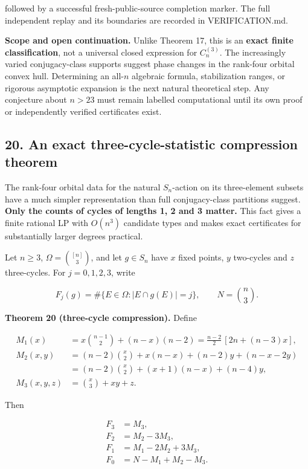 \documentclass[
  11pt,
]{article}
\begin{document}
followed by a successful fresh-public-source completion marker. The full
independent replay and its boundaries are recorded in VERIFICATION.md.

\textbf{Scope and open continuation.} Unlike Theorem 17, this is an
\textbf{exact finite classification}, not a universal closed expression
for \(C_n^{(3)}\). The increasingly varied conjugacy-class supports
suggest phase changes in the rank-four orbital convex hull. Determining
an all-\(n\) algebraic formula, stabilization ranges, or rigorous
asymptotic expansion is the next natural theoretical step. Any
conjecture about \(n>23\) must remain labelled computational until its
own proof or independently verified certificates exist.

\subsection{20. An exact three-cycle-statistic compression
theorem}\label{an-exact-three-cycle-statistic-compression-theorem}

The rank-four orbital data for the natural \(S_n\)-action on its
three-element subsets have a much simpler representation than full
conjugacy-class partitions suggest. \textbf{Only the counts of cycles of
lengths 1, 2 and 3 matter.} This fact gives a finite rational LP with
\(O(n^3)\) candidate types and makes exact certificates for
substantially larger degrees practical.

Let \(n\ge3\), \(\Omega=\binom{[n]}3\), and let \(g\in S_n\) have \(x\)
fixed points, \(y\) two-cycles and \(z\) three-cycles. For
\(j=0,1,2,3\), write

\[
F_j(g)=\#\{E\in\Omega:|E\cap g(E)|=j\},
\qquad N=\binom n3.
\]

\textbf{Theorem 20 (three-cycle compression).} Define

\[
\begin{aligned}
M_1(x)&=x\binom{n-1}{2}+(n-x)(n-2)
     =\frac{n-2}{2}\,[2n+(n-3)x],\\
M_2(x,y)&=(n-2)\binom x2+x(n-x)+(n-2)y+(n-x-2y)\\
        &=(n-2)\binom x2+(x+1)(n-x)+(n-4)y,\\
M_3(x,y,z)&=\binom x3+xy+z.
\end{aligned}\tag{99}
\]

Then

\[
\boxed{
\begin{aligned}
F_3&=M_3,\\
F_2&=M_2-3M_3,\\
F_1&=M_1-2M_2+3M_3,\\
F_0&=N-M_1+M_2-M_3.
\end{aligned}} \tag{100}
\]
\end{document}
